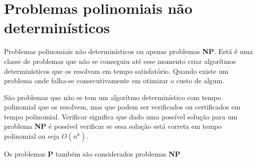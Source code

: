 \section{Problemas polinomiais não determinísticos}
Problemas polinomiais não determinísticos ou apenas problemas \textbf{NP}. Está é uma classe de problemas que não se conseguiu até esse momento criar algorítmos determinísticos que os resolvam em tempo satisfatório. Quando existe um problema onde falha-se consecutivamente em otimizar o custo de algum.

São problemas que não se tem um algorítmo determinístico com tempo polinomial que os resolvem, mas que podem ser verificados ou certificados em tempo polinomial. Verificar significa que dado uma possível solução para um problema \textbf{NP} é possível verificar se essa solução está correta em tempo polinomial ou seja $O(n^k)$.

Os problemas \textbf{P} também são considerados problemas \textbf{NP}
